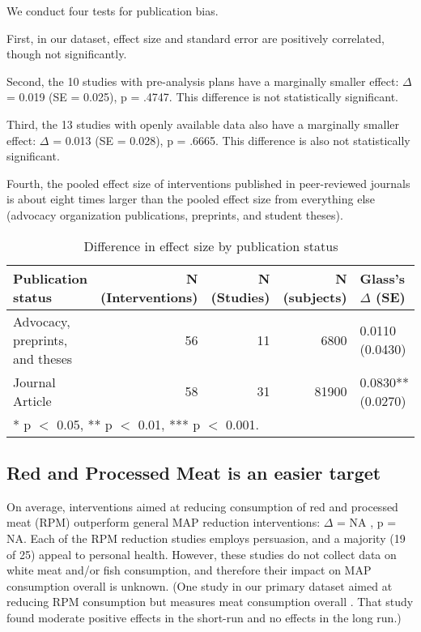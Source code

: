 \documentclass[sn-nature,pdflatex]{sn-jnl}
\begin{document}
We conduct four tests for publication bias.

\begin{comment} 
Could put in introductory remarks about how this puts our main results in one light or another? 
\end{comment}

First, in our dataset, effect size and standard error are positively
correlated, though not significantly.

Second, the 10 studies with pre-analysis plans have a marginally smaller
effect: \(\Delta\) = 0.019 (SE = 0.025), p = .4747. This difference is
not statistically significant.

Third, the 13 studies with openly available data also have a marginally
smaller effect: \(\Delta\) = 0.013 (SE = 0.028), p = .6665. This
difference is also not statistically significant.

Fourth, the pooled effect size of interventions published in
peer-reviewed journals is about eight times larger than the pooled
effect size from everything else (advocacy organization publications,
preprints, and student theses).

\begin{table}[!h]
\centering
\caption{\label{tab:table_three}Difference in effect size by publication status}
\centering
\begin{tabular}[t]{lrrrl}
\toprule
Publication status & N (Interventions) & N (Studies) & N (subjects) & Glass's $\Delta$ (SE)\\
\midrule
Advocacy, preprints, and theses & 56 & 11 & 6800 & 0.0110 (0.0430)\\
Journal Article & 58 & 31 & 81900 & 0.0830** (0.0270)\\
\bottomrule
\multicolumn{5}{l}{\rule{0pt}{1em}* p $<$ 0.05, ** p $<$ 0.01, *** p $<$ 0.001.}\\
\end{tabular}
\end{table}

\subsection{Red and Processed Meat is an easier target}\label{sec2.3}

On average, interventions aimed at reducing consumption of red and
processed meat (RPM) outperform general MAP reduction interventions:
\(\Delta\) = NA , p = NA. Each of the RPM reduction
studies employs persuasion, and a majority (19 of 25) appeal to personal
health. However, these studies do not collect data on white meat and/or
fish consumption, and therefore their impact on MAP consumption overall
is unknown. (One study in our primary dataset aimed at reducing RPM
consumption but measures meat consumption overall \citep{shreedhar2021}.
That study found moderate positive effects in the short-run and no
effects in the long run.)
\end{document}
